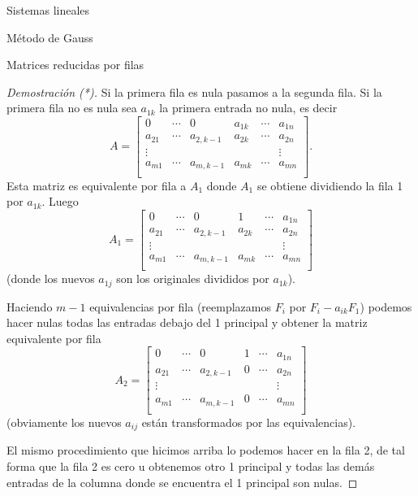 \documentclass[a4paper,12pt,twoside,spanish]{amsbook}
\theoremstyle{definition}
\theoremstyle{remark}
\begin{document}
\begin{chapter}{Sistemas lineales}
\begin{section}{Método de Gauss }
\begin{subsection}{Matrices reducidas por filas}
\begin{proof}[Demostración (*)]
					Si la primera fila es nula pasamos a la segunda fila. Si la primera fila no es nula sea $a_{1k}$ la primera entrada no nula, es decir
					\begin{equation*}
					A = \begin{bmatrix}
					0 & \cdots & 0 & a_{1k} & \cdots & a_{1n} \\
					a_{21}& \cdots & a_{2,k-1} & a_{2k} & \cdots & a_{2n} \\
					\vdots&  &  &  &  & \vdots \\
					a_{m1}& \cdots & a_{m,k-1} & a_{mk} & \cdots & a_{mn} \\
					\end{bmatrix}.
					\end{equation*} 
					Esta matriz es equivalente por fila a $A_1$ donde $A_1$ se obtiene dividiendo la fila 1 por $a_{1k}$. Luego 
					\begin{equation*}
					A_1 = \begin{bmatrix}
					0 & \cdots & 0 & 1 & \cdots & a_{1n} \\
					a_{21}& \cdots & a_{2,k-1} & a_{2k} & \cdots & a_{2n} \\
					\vdots&  &  &  &  & \vdots \\
					a_{m1}& \cdots & a_{m,k-1} & a_{mk} & \cdots & a_{mn} \\
					\end{bmatrix}
					\end{equation*}
					(donde los nuevos $a_{1j}$ son  los originales divididos por $a_{1k}$).  
					
					Haciendo $m-1$ equivalencias por fila (reemplazamos $F_i$ por $F_i - a_{ik}F_1$) podemos hacer nulas todas las entradas debajo del  1 principal y obtener la matriz equivalente por fila
					\begin{equation*}
					A_2 = \begin{bmatrix}
					0 & \cdots & 0 & 1 & \cdots & a_{1n} \\
					a_{21}& \cdots & a_{2,k-1} & 0 & \cdots & a_{2n} \\
					\vdots&  &  &  &  & \vdots \\
					a_{m1}& \cdots & a_{m,k-1} &0 & \cdots & a_{mn} \\
					\end{bmatrix}
					\end{equation*}
					(obviamente los nuevos $a_{ij}$ están transformados por las equivalencias).
					
					El mismo procedimiento que hicimos arriba lo podemos hacer en la fila 2,  de tal forma que la fila 2 es cero u obtenemos otro 1 principal y todas las demás entradas de la columna donde se encuentra el 1 principal son nulas. 
					

\end{proof}
\end{subsection}
\end{section}
\end{chapter}
\end{document}
